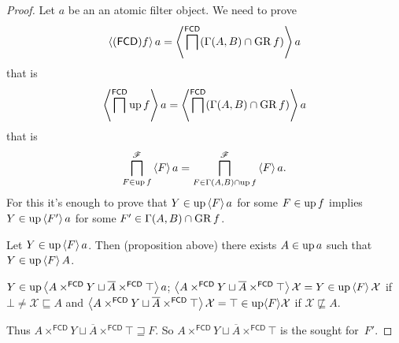 \begin{proof}
Let $a$ be an an atomic filter object. We need to prove 
\[
\left\langle (\mathsf{FCD}) f\right\rangle a=\left\langle \bigsqcap^{\mathsf{FCD}}(\Gamma(A,B)\cap\operatorname{GR} f)\right\rangle a
\]
that is 
\[
\left\langle \bigsqcap^{\mathsf{FCD}}\operatorname{up} f\right\rangle a=\left\langle \bigsqcap^{\mathsf{FCD}}(\Gamma(A,B)\cap\operatorname{GR} f)\right\rangle a
\]
that is 
\[
\bigsqcap_{F\in\operatorname{up} f}^{\mathscr{F}}\left\langle F\right\rangle a=\bigsqcap_{F\in\Gamma(A,B)\cap\operatorname{up} f}^{\mathscr{F}}\left\langle F\right\rangle a.
\]
For this it's enough to prove that $Y\in\operatorname{up}\left\langle F\right\rangle a$ for some $F\in\operatorname{up} f$
implies $Y\in\operatorname{up}\left\langle F'\right\rangle a$ for some $F'\in\Gamma(A,B)\cap\operatorname{GR} f$.

Let $Y\in\operatorname{up}\left\langle F\right\rangle a$. Then (proposition above) there exists $A\in\operatorname{up} a$
such that $Y\in\operatorname{up}\left\langle F\right\rangle A$.

$Y\in\operatorname{up}\left\langle A\times^{\mathsf{FCD}}Y\sqcup\overline{A}\times^{\mathsf{FCD}}\top\right\rangle a$;
$\left\langle A\times^{\mathsf{FCD}}Y\sqcup\overline{A}\times^{\mathsf{FCD}}\top\right\rangle\mathcal{X}=Y\in\operatorname{up}\left\langle F\right\rangle\mathcal{X}$
if $\bot\neq\mathcal{X}\sqsubseteq A$ and $\left\langle A\times^{\mathsf{FCD}}Y\sqcup\overline{A}\times^{\mathsf{FCD}}\top\right\rangle\mathcal{X}=\top\in\operatorname{up}\langle F\rangle\mathcal{X}$
if $\mathcal{X}\nsqsubseteq A$.

Thus $A\times^{\mathsf{FCD}}Y\sqcup\overline{A}\times^{\mathsf{FCD}}\top\sqsupseteq F$.
So $A\times^{\mathsf{FCD}}Y\sqcup\overline{A}\times^{\mathsf{FCD}}\top$
is the sought for~$F'$.
\end{proof}

